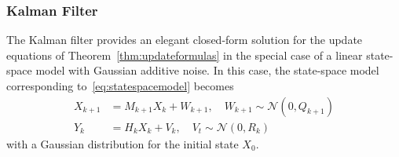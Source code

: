 \subsubsection{Kalman Filter}
The Kalman filter provides an elegant closed-form solution for the update equations of Theorem~\ref{thm:updateformulas} in the special case of a linear state-space model with Gaussian additive noise.
In this case, the state-space model corresponding to~\eqref{eq:statespacemodel} becomes
\begin{subequations}\label{eq:kalmanstatespace}
    \begin{align}
        X_{k+1} &= M_{k+1}X_{k}  + W_{k+1}, \quad W_{k+1} \sim \mathcal{N}(0, Q_{k+1})\\
        Y_{k} &= H_{k}X_{k} + V_{k}, \quad V_t \sim \mathcal{N}(0, R_k)
    \end{align}
\end{subequations}
with a Gaussian distribution for the initial state $X_0$.

